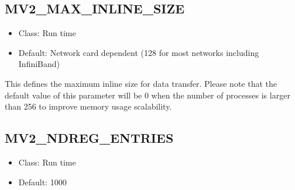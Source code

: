 % 
% 
% 
% 
% 
% 


\subsection{MV2\_MAX\_INLINE\_SIZE}
\label{def:nem-max-inline-size}
\begin{itemize}
    \item Class: Run time
    \item Default: Network card dependent (128 for most networks including InfiniBand)
\end{itemize}

This defines the maximum inline size for data transfer. Please note that the 
default value of this parameter will be 0 when the number of processes is larger than
256 to improve memory usage scalability.

\subsection{MV2\_NDREG\_ENTRIES}
\label{def:nem-ndreg-entries}
\begin{itemize}
    \item Class: Run time
    \item Default: 1000
\end{itemize}

